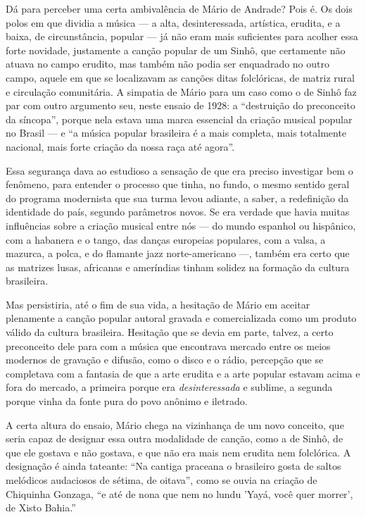 Dá para perceber uma certa ambivalência de Mário de Andrade? Pois é. Os
dois polos em que dividia a música --- a alta, desinteressada, artística,
erudita, e a baixa, de circunstância, popular --- já não eram mais
suficientes para acolher essa forte novidade, justamente a canção
popular de um Sinhô, que certamente não atuava no campo erudito, mas
também não podia ser enquadrado no outro campo, aquele em que se
localizavam as canções ditas folclóricas, de matriz rural e circulação
comunitária. A simpatia de Mário para um caso como o de Sinhô faz par
com outro argumento seu, neste ensaio de 1928: a ``destruição do
preconceito da síncopa'', porque nela estava uma marca essencial da
criação musical popular no Brasil --- e ``a música popular brasileira é a
mais completa, mais totalmente nacional, mais forte criação da nossa
raça até agora''.

Essa segurança dava ao estudioso a sensação de que era preciso
investigar bem o fenômeno, para entender o processo que tinha, no fundo,
o mesmo sentido geral do programa modernista que sua turma levou
adiante, a saber, a redefinição da identidade do país, segundo
parâmetros novos. Se era verdade que havia muitas influências sobre a
criação musical entre nós --- do mundo espanhol ou hispânico, com a
habanera e o tango, das danças europeias populares, com a valsa, a
mazurca, a polca, e do flamante jazz norte-americano ---, também era
certo que as matrizes lusas, africanas e ameríndias tinham solidez na
formação da cultura brasileira.

Mas persistiria, até o fim de sua vida, a hesitação de Mário em aceitar
plenamente a canção popular autoral gravada e comercializada como um
produto válido da cultura brasileira. Hesitação que se devia em parte,
talvez, a certo preconceito dele para com a música que encontrava
mercado entre os meios modernos de gravação e difusão, como o disco e o
rádio, percepção que se completava com a fantasia de que a arte erudita
e a arte popular estavam acima e fora do mercado, a primeira porque era
\textit{desinteressada} e sublime, a segunda porque vinha da fonte pura do
povo anônimo e iletrado.

A certa altura do ensaio, Mário chega na vizinhança de um novo conceito,
que seria capaz de designar essa outra modalidade de canção, como a de
Sinhô, de que ele gostava e não gostava, e que não era mais nem erudita
nem folclórica. A designação é ainda tateante: ``Na cantiga praceana o
brasileiro gosta de saltos melódicos audaciosos de sétima, de oitava'',
como se ouvia na criação de Chiquinha Gonzaga, ``e até de nona que nem
no lundu 'Yayá, você quer morrer', de Xisto Bahia.''

